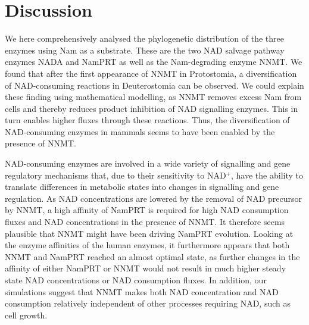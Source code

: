 
\section{Discussion}

We here comprehensively analysed the phylogenetic distribution of the three enzymes using Nam as a substrate. These are the two NAD salvage pathway enzymes NADA and NamPRT as well as the Nam-degrading enzyme NNMT. We found that after the first appearance of NNMT in Protostomia, a diversification of NAD-consuming reactions in Deuterostomia can be observed. We could explain these finding using mathematical modelling, as NNMT removes excess Nam from cells and thereby reduces product inhibition of NAD signalling enzymes. This in turn enables higher fluxes through these reactions. Thus, the diversification of NAD-consuming enzymes in mammals seems to have been enabled by the presence of NNMT.

NAD-consuming enzymes are involved in a wide variety of signalling and gene regulatory mechanisms that, due to their sensitivity to NAD$^{+}$, have the ability to translate differences in metabolic states into changes in signalling and gene regulation. As NAD concentrations are lowered by the removal of NAD precursor by NNMT,  a high affinity of NamPRT is required for high NAD consumption fluxes and NAD concentrations in the presence of NNMT. It therefore seems plausible that NNMT might have been driving NamPRT evolution. Looking at the enzyme affinities of the human enzymes, it furthermore appears that both NNMT and NamPRT reached an almost optimal state, as further changes in the affinity of either NamPRT or NNMT would not result in much higher steady state NAD concentrations or NAD consumption fluxes. In addition, our simulations suggest that NNMT makes both NAD concentration and NAD consumption relatively independent of other processes requiring NAD, such as cell growth.

